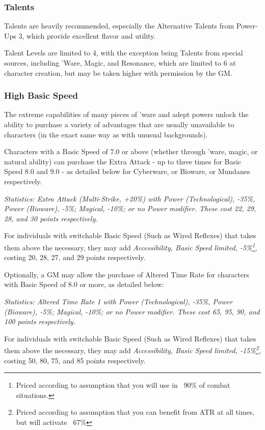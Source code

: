 \begin{multicols*}{3}
	\subsubsection{Talents}
	
	Talents are heavily recommended, especially the Alternative Talents from Power-Ups 3, which provide excellent flavor and utility. 
	
	Talent Levels are limited to 4, with the exception being Talents from special sources, including 'Ware, Magic, and Resonance, which are limited to 6 at character creation, but may be taken higher with permission by the GM.
	
	\subsubsection{High Basic Speed}\label{high_basic_speed}
	
	The extreme capabilities of many pieces of 'ware and adept powers unlock the ability to purchase a variety of advantages that are usually unavailable to characters (in the exact same way as with unusual backgrounds).
	
	Characters with a Basic Speed of 7.0 or above (whether through 'ware, magic, or natural ability) can purchase the Extra Attack - up to three times for Basic Speed 8.0 and 9.0 - as detailed below for Cyberware, or Bioware, or Mundanes respectively.
	
	\textit{\textcolor{OliveGreen}{Statistics: Extra Attack (Multi-Strike, +20\%) with Power (Technological), -35\%, Power (Bioware), -5\%; Magical, -10\%; or no Power modifier. These cost 22, 29, 28, and 30 points respectively.}}
	
	For individuals with switchable Basic Speed (Such as Wired Reflexes) that takes them above the necessary, they may add \textit{Accessibility, Basic Speed limited, -5\%\footnote{Priced according to assumption that you will use in ~90\% of combat situations.}}, costing 20, 28, 27, and 29 points respectively.
	
	Optionally, a GM may allow the purchase of Altered Time Rate for characters with Basic Speed of 8.0 or more, as detailed below:
	
	\textit{\textcolor{OliveGreen}{Statistics: Altered Time Rate 1 with Power (Technological), -35\%, Power (Bioware), -5\%; Magical, -10\%; or no Power modifier. These cost 65, 95, 90, and 100 points respectively.}}
	
	For individuals with switchable Basic Speed (Such as Wired Reflexes) that takes them above the necessary, they may add \textit{Accessibility, Basic Speed limited, -15\%\footnote{Priced according to assumption that you can benefit from ATR at all times, but will activate ~67\%}}, costing 50, 80, 75, and 85 points respectively. 
	

\end{multicols*}

